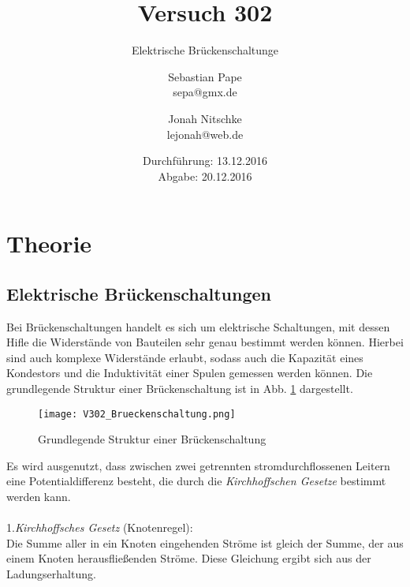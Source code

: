 

\title{Versuch 302}
\subtitle{Elektrische Brückenschaltunge}
\author{Sebastian Pape\\
        sepa@gmx.de \and
        Jonah Nitschke\\
        lejonah@web.de}
\date{Durchführung: 13.12.2016\\
      Abgabe: 20.12.2016}


\maketitle
\setcounter{page}{1}
\section{Theorie}

\subsection{Elektrische Brückenschaltungen}

Bei Brückenschaltungen handelt es sich um elektrische Schaltungen, mit dessen
Hifle die Widerstände von Bauteilen sehr genau bestimmt werden können.
Hierbei sind auch komplexe Widerstände erlaubt, sodass auch die Kapazität eines
Kondestors und die Induktivität einer Spulen gemessen werden können.
Die grundlegende Struktur einer Brückenschaltung ist in Abb. \ref{fig:Brückenschaltung}
dargestellt.

\begin{figure}
  \texttt{[image: V302\_Brueckenschaltung.png]}
  \caption{Grundlegende Struktur einer Brückenschaltung\cite{anleitung01}}
  \label{fig:Brückenschaltung}
\end{figure}

Es wird ausgenutzt, dass zwischen zwei getrennten stromdurchflossenen
Leitern eine Potentialdifferenz besteht, die durch die \emph{Kirchhoffschen Gesetze}
bestimmt werden kann.\\\\

1.\emph{Kirchhoffsches Gesetz} (Knotenregel):\\
Die Summe aller in ein Knoten eingehenden Ströme ist gleich der Summe, der aus
einem Knoten herausfließenden Ströme. Diese Gleichung ergibt sich aus der
Ladungserhaltung.

